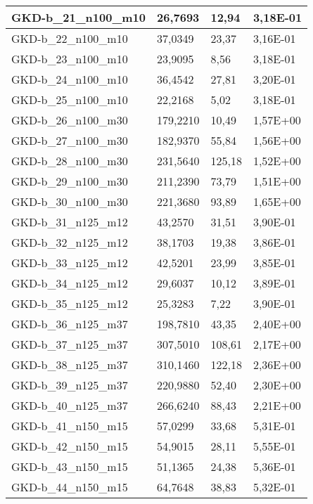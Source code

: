 \begin{table}[!ht]
\begin{adjustbox}{height=12cm}
\begin{tabular}{|l|l|l|l|}
		GKD-b\_21\_n100\_m10 & 26,7693  & 12,94         & 3,18E-01 \\ \hline
		GKD-b\_22\_n100\_m10 & 37,0349  & 23,37         & 3,16E-01 \\ \hline
		GKD-b\_23\_n100\_m10 & 23,9095  & 8,56          & 3,18E-01 \\ \hline
		GKD-b\_24\_n100\_m10 & 36,4542  & 27,81         & 3,20E-01 \\ \hline
		GKD-b\_25\_n100\_m10 & 22,2168  & 5,02          & 3,18E-01 \\ \hline
		GKD-b\_26\_n100\_m30 & 179,2210 & 10,49         & 1,57E+00 \\ \hline
		GKD-b\_27\_n100\_m30 & 182,9370 & 55,84         & 1,56E+00 \\ \hline
		GKD-b\_28\_n100\_m30 & 231,5640 & 125,18        & 1,52E+00 \\ \hline
		GKD-b\_29\_n100\_m30 & 211,2390 & 73,79         & 1,51E+00 \\ \hline
		GKD-b\_30\_n100\_m30 & 221,3680 & 93,89         & 1,65E+00 \\ \hline
		GKD-b\_31\_n125\_m12 & 43,2570  & 31,51         & 3,90E-01 \\ \hline
		GKD-b\_32\_n125\_m12 & 38,1703  & 19,38         & 3,86E-01 \\ \hline
		GKD-b\_33\_n125\_m12 & 42,5201  & 23,99         & 3,85E-01 \\ \hline
		GKD-b\_34\_n125\_m12 & 29,6037  & 10,12         & 3,89E-01 \\ \hline
		GKD-b\_35\_n125\_m12 & 25,3283  & 7,22          & 3,90E-01 \\ \hline
		GKD-b\_36\_n125\_m37 & 198,7810 & 43,35         & 2,40E+00 \\ \hline
		GKD-b\_37\_n125\_m37 & 307,5010 & 108,61        & 2,17E+00 \\ \hline
		GKD-b\_38\_n125\_m37 & 310,1460 & 122,18        & 2,36E+00 \\ \hline
		GKD-b\_39\_n125\_m37 & 220,9880 & 52,40         & 2,30E+00 \\ \hline
		GKD-b\_40\_n125\_m37 & 266,6240 & 88,43         & 2,21E+00 \\ \hline
		GKD-b\_41\_n150\_m15 & 57,0299  & 33,68         & 5,31E-01 \\ \hline
		GKD-b\_42\_n150\_m15 & 54,9015  & 28,11         & 5,55E-01 \\ \hline
		GKD-b\_43\_n150\_m15 & 51,1365  & 24,38         & 5,36E-01 \\ \hline
		GKD-b\_44\_n150\_m15 & 64,7648  & 38,83         & 5,32E-01 \\ \hline

\end{tabular}
\end{adjustbox}
\end{table}
